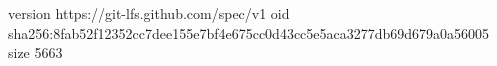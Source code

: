version https://git-lfs.github.com/spec/v1
oid sha256:8fab52f12352cc7dee155e7bf4e675cc0d43cc5e5aca3277db69d679a0a56005
size 5663
